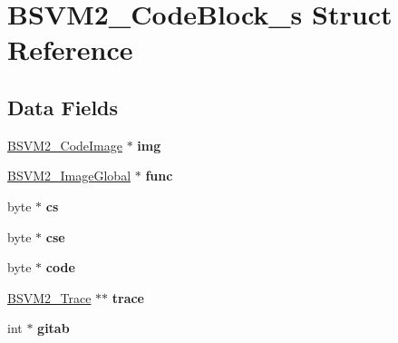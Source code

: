 \hypertarget{structBSVM2__CodeBlock__s}{\section{B\-S\-V\-M2\-\_\-\-Code\-Block\-\_\-s Struct Reference}
\label{structBSVM2__CodeBlock__s}
}
\subsection*{Data Fields}
\begin{DoxyCompactItemize}
\item 
\hypertarget{structBSVM2__CodeBlock__s_ae452d23018b60c0105493065b68e622f}{\hyperlink{structBSVM2__CodeImage__s}{B\-S\-V\-M2\-\_\-\-Code\-Image} $\ast$ {\bfseries img}}\label{structBSVM2__CodeBlock__s_ae452d23018b60c0105493065b68e622f}

\item 
\hypertarget{structBSVM2__CodeBlock__s_af5a6ac2cd04216498426398e9f6b6632}{\hyperlink{structBSVM2__ImageGlobal__s}{B\-S\-V\-M2\-\_\-\-Image\-Global} $\ast$ {\bfseries func}}\label{structBSVM2__CodeBlock__s_af5a6ac2cd04216498426398e9f6b6632}

\item 
\hypertarget{structBSVM2__CodeBlock__s_ae7d35cb5e19b640da556a845eb0d7ff3}{byte $\ast$ {\bfseries cs}}\label{structBSVM2__CodeBlock__s_ae7d35cb5e19b640da556a845eb0d7ff3}

\item 
\hypertarget{structBSVM2__CodeBlock__s_afb66c683d290365bff258640b491410f}{byte $\ast$ {\bfseries cse}}\label{structBSVM2__CodeBlock__s_afb66c683d290365bff258640b491410f}

\item 
\hypertarget{structBSVM2__CodeBlock__s_a1292ea5f1a7ba2ce86988aedb5ce92e2}{byte $\ast$ {\bfseries code}}\label{structBSVM2__CodeBlock__s_a1292ea5f1a7ba2ce86988aedb5ce92e2}

\item 
\hypertarget{structBSVM2__CodeBlock__s_aaf4f2e4e4ad95298f2338244a87aeaec}{\hyperlink{structBSVM2__Trace__s}{B\-S\-V\-M2\-\_\-\-Trace} $\ast$$\ast$ {\bfseries trace}}\label{structBSVM2__CodeBlock__s_aaf4f2e4e4ad95298f2338244a87aeaec}

\item 
\hypertarget{structBSVM2__CodeBlock__s_a00547b0652188aaf85a496b4e2cdc731}{int $\ast$ {\bfseries gitab}}\label{structBSVM2__CodeBlock__s_a00547b0652188aaf85a496b4e2cdc731}


\end{DoxyCompactItemize}
